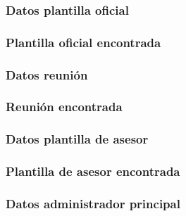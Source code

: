   

  \subsubsection{Datos plantilla oficial}

  

  \subsubsection{Plantilla oficial encontrada}

  

  \subsubsection{Datos reunión}

  

  \subsubsection{Reunión encontrada}

  

  \subsubsection{Datos plantilla de asesor}

  

  \subsubsection{Plantilla de asesor encontrada}

  

  \subsubsection{Datos administrador principal}

